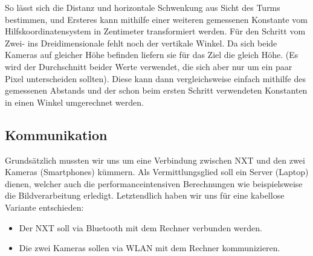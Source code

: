 \documentclass[12pt,a4paper]{article}
\begin{document}
So lässt sich die Distanz und horizontale Schwenkung aus Sicht des Turms bestimmen, und Ersteres kann mithilfe einer weiteren gemessenen Konstante vom Hilfskoordinatensystem in Zentimeter transformiert werden.
Für den Schritt vom Zwei- ins Dreidimensionale fehlt noch der vertikale Winkel. Da sich beide Kameras auf gleicher Höhe befinden liefern sie für das Ziel die gleich Höhe. (Es wird der Durchschnitt beider Werte verwendet, die sich aber nur um ein paar Pixel unterscheiden sollten). Diese kann dann vergleichsweise einfach mithilfe des gemessenen Abstands und der schon beim ersten Schritt verwendeten Konstanten in einen Winkel umgerechnet werden.

\subsection{Kommunikation}
Grundsätzlich mussten wir uns um eine Verbindung zwischen NXT und den zwei Kameras (Smartphones) kümmern. Als Vermittlungsglied soll ein Server (Laptop) dienen, welcher auch die performanceintensiven Berechnungen wie beispielsweise die Bildverarbeitung erledigt. Letztendlich haben wir uns für eine kabellose Variante entschieden:
\begin{itemize}
\item
Der NXT soll via Bluetooth mit dem Rechner verbunden werden.
\item
Die zwei Kameras sollen via WLAN mit dem Rechner kommunizieren.
\end{itemize}
\end{document}
